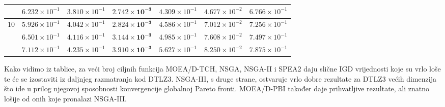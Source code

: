 \documentclass[times, utf8, zavrsni, numeric]{fer}
\begin{document}
\begin{table}[htb]
\begin{tabular}{c|c|c|c|c|c|c}
                    & $6.232\times 10^{-1}$    & $3.810\times 10^{-1}$ & $\mathbf{2.742\times 10^{-3}}$ & $4.309\times 10^{-1}$ & $4.677\times 10^{-2}$ & $6.766\times 10^{-1}$\\ \hline
\multirow{3}{*}{10} & $5.926\times 10^{-1}$    & $4.042\times 10^{-1}$ & $\mathbf{2.824\times 10^{-3}}$ & $4.586\times 10^{-1}$ & $7.012\times 10^{-2}$ & $7.256\times 10^{-1}$\\
			        & $6.501\times 10^{-1}$    & $4.116\times 10^{-1}$ & $\mathbf{3.144\times 10^{-3}}$ & $4.985\times 10^{-1}$ & $7.608\times 10^{-2}$ & $7.497\times 10^{-1}$\\
                    & $7.112\times 10^{-1}$    & $4.235\times 10^{-1}$ & $\mathbf{3.910\times 10^{-3}}$ & $5.627\times 10^{-1}$ & $8.250\times 10^{-2}$ & $7.875\times 10^{-1}$\\ \hline
\end{tabular}
\end{table}
Kako vidimo iz tablice, za veći broj ciljnih funkcija MOEA/D-TCH, NSGA, NSGA-II i SPEA2 daju slične IGD vrijednosti koje su vrlo loše te će se izostaviti iz daljnjeg razmatranja kod DTLZ3. NSGA-III, s druge strane, ostvaruje vrlo dobre rezultate za DTLZ3 većih dimenzija što ide u prilog njegovoj sposobnosti konvergencije globalnoj Pareto fronti. MOEA/D-PBI također daje prihvatljive rezultate, ali znatno lošije od onih koje pronalazi NSGA-III.

\FloatBarrier
\end{document}
